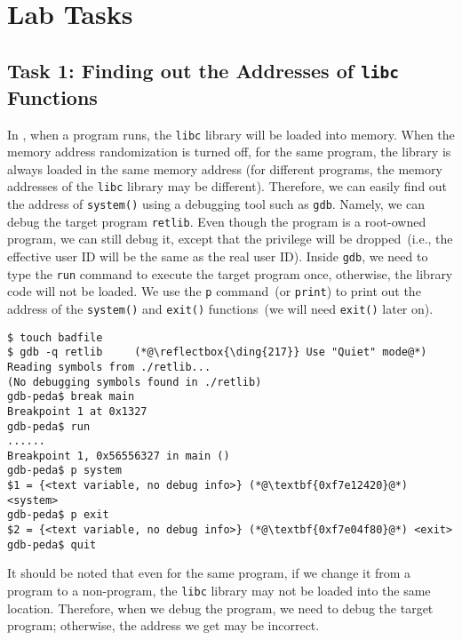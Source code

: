 \section{Lab Tasks}



\subsection{Task 1: Finding out the Addresses of \texttt{libc} Functions} 

In \linux, when a program runs, the \texttt{libc} library will be loaded
into memory. When the memory address randomization is turned off,
for the same program, the library is always loaded in the same memory
address (for different programs, the memory addresses
of the \texttt{libc} library may be different).
Therefore, we can easily find out the address of \texttt{system()}
using a debugging tool such as \texttt{gdb}. Namely, we can debug
the target program \texttt{retlib}. Even though the program is a root-owned \setuid program,
we can still debug it, except that the privilege will be dropped~(i.e., the effective user ID
will be the same as the real user ID).
Inside \texttt{gdb}, we need to type the \texttt{run} command to execute the target program once,
otherwise, the library code will not be loaded.
We use the \texttt{p} command~(or \texttt{print}) to print out the address of
the \texttt{system()} and \texttt{exit()} functions~(we will need \texttt{exit()} later on).

\begin{lstlisting}
$ touch badfile
$ gdb -q retlib     (*@\reflectbox{\ding{217}} Use "Quiet" mode@*)
Reading symbols from ./retlib...
(No debugging symbols found in ./retlib)
gdb-peda$ break main
Breakpoint 1 at 0x1327
gdb-peda$ run
......
Breakpoint 1, 0x56556327 in main ()
gdb-peda$ p system
$1 = {<text variable, no debug info>} (*@\textbf{0xf7e12420}@*) <system>
gdb-peda$ p exit
$2 = {<text variable, no debug info>} (*@\textbf{0xf7e04f80}@*) <exit>
gdb-peda$ quit
\end{lstlisting}

It should be noted that even for the same program, if we change it from a \setuid
program to a non-\setuid program, the \texttt{libc} library may not be loaded
into the same location. Therefore, when we debug the program, we need
to debug the target \setuid program; otherwise, the address we
get may be incorrect.

